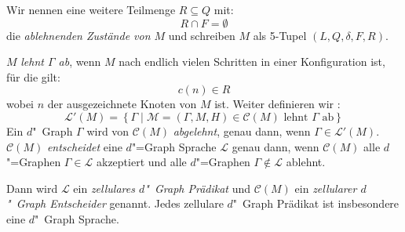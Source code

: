 \documentclass[11pt]{article}
\newcommand{\defWord}[1]{\emph{#1}}
\begin{document}
\begin{definition}
	Wir nennen eine weitere Teilmenge $R \subseteq Q$ mit: 
	\begin{displaymath}
		R \cap F = \emptyset
	\end{displaymath} 
	die \defWord{ablehnenden Zustände von $M$} und schreiben $M$ als 5-Tupel $\left(L, Q, \delta, F, R\right)$.
	
	$M$ \defWord{lehnt $\Gamma$ ab}, wenn $M$ nach endlich vielen Schritten in einer Konfiguration ist, für die gilt: 
	\begin{displaymath}
		c(n) \in R
	\end{displaymath}
	wobei $n$ der ausgezeichnete Knoten von $M$ ist.
	Weiter definieren wir : 
	\begin{displaymath}
		\mathcal{L}'(M) = \left\{\Gamma \mid \mathcal{M} = \left(\Gamma, M, H\right) \in \mathcal{C}(M) \text{ lehnt } \Gamma \text{ ab}\right\}
	\end{displaymath}
	Ein $d$"~Graph $\Gamma$ wird von $\mathcal{C}(M)$ \defWord{abgelehnt}, genau dann, wenn $\Gamma \in \mathcal{L}'(M)$.
	$\mathcal{C}(M)$ \defWord{entscheidet} eine $d$"=Graph Sprache $\mathcal{L}$ genau dann, wenn $\mathcal{C}(M)$ alle $d$"=Graphen $\Gamma \in \mathcal{L}$ akzeptiert und alle $d$"=Graphen $\Gamma \notin \mathcal{L}$ ablehnt.
	
	Dann wird $\mathcal{L}$ ein \defWord{zellulares $d$"~Graph Prädikat} und $\mathcal{C}(M)$ ein \defWord{zellularer $d$"~Graph Entscheider} genannt. 
	Jedes zellulare $d$"~Graph Prädikat ist insbesondere eine $d$"~Graph Sprache.
\end{definition}
\end{document}
